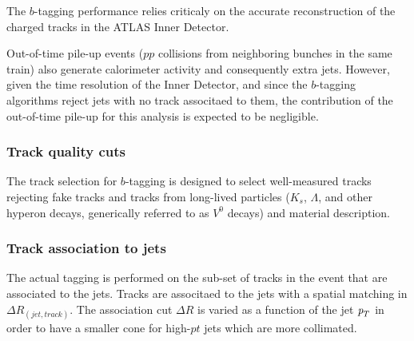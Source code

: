 \begin{itemize}
\begin{itemize}
The $b$-tagging performance relies criticaly on the accurate reconstruction of the charged tracks in the ATLAS Inner Detector. 




Out-of-time pile-up events ($pp$ collisions from neighboring bunches in the same train) also generate calorimeter activity and consequently extra jets. However, given the time resolution of the Inner Detector, and since the $b$-tagging algorithms reject jets with no track associtaed to them, the contribution of the out-of-time pile-up for this analysis is expected to be negligible.





\subsubsection{Track quality cuts}


The track selection for $b$-tagging is designed to select well-measured tracks rejecting fake tracks and tracks from long-lived particles ($K_s$, $\Lambda$, and other hyperon decays, generically referred to as $V^0$ decays) and material description.




\subsubsection{Track association to jets}

The actual tagging is performed on the sub-set of tracks in the event that are associated to the jets. Tracks are associtaed to the jets with a spatial matching in $\Delta R_{(jet,track)}$. The association cut $\Delta R$ is varied as a function of the jet ${\emph{p}_{T}}$ in order to have a smaller cone for high-$pt$ jets which are more collimated.





\end{itemize}
\end{itemize}
